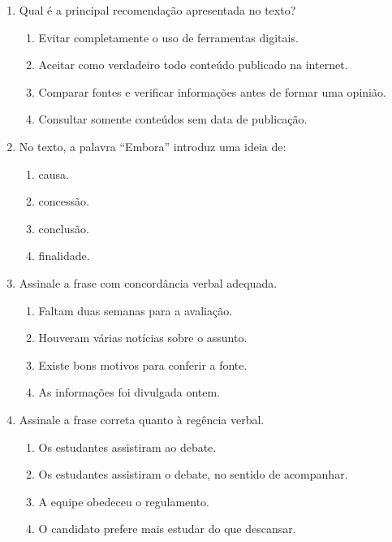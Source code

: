\documentclass[12pt,a4paper]{article}
\begin{document}
\begin{enumerate}
  \item Qual é a principal recomendação apresentada no texto?
  \begin{enumerate}[label=\alph*)]
    \item Evitar completamente o uso de ferramentas digitais.
    \item Aceitar como verdadeiro todo conteúdo publicado na internet.
    \item Comparar fontes e verificar informações antes de formar uma opinião.
    \item Consultar somente conteúdos sem data de publicação.
  \end{enumerate}

  \item No texto, a palavra ``Embora'' introduz uma ideia de:
  \begin{enumerate}[label=\alph*)]
    \item causa.
    \item concessão.
    \item conclusão.
    \item finalidade.
  \end{enumerate}

  \item Assinale a frase com concordância verbal adequada.
  \begin{enumerate}[label=\alph*)]
    \item Faltam duas semanas para a avaliação.
    \item Houveram várias notícias sobre o assunto.
    \item Existe bons motivos para conferir a fonte.
    \item As informações foi divulgada ontem.
  \end{enumerate}

  \item Assinale a frase correta quanto à regência verbal.
  \begin{enumerate}[label=\alph*)]
    \item Os estudantes assistiram ao debate.
    \item Os estudantes assistiram o debate, no sentido de acompanhar.
    \item A equipe obedeceu o regulamento.
    \item O candidato prefere mais estudar do que descansar.
  \end{enumerate}
\end{enumerate}
\end{document}
